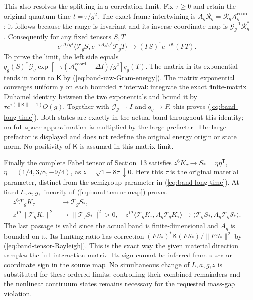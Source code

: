 This also resolves the splitting in a correlation limit. Fix
$\tau\ge0$ and retain the original quantum time $t=\tau/g^2$.
The exact frame intertwining is
$A_g\mathcal R_g=\mathcal R_g\mathcal A_g^{\mathrm{coord}}$;
it follows because the range is invariant and its inverse coordinate
map is $\mathcal G_g^{-1}\mathcal R_g^*$. Consequently for any
fixed tensors $S,T$,
\begin{equation}\label{eq:band-long-time}
 e^{\tau\Delta/g^2}
 \langle\mathcal T_gS,e^{-\tau A_g/g^2}\mathcal T_gT\rangle
 \longrightarrow (FS)^*e^{-\tau\mathsf K}(FT).
\end{equation}
To prove the limit, the left side equals
$q_g(S)^*\mathcal G_g
 \exp[-\tau(\mathcal A_g^{\mathrm{coord}}-\Delta I)/g^2]q_g(T)$.
The matrix in its exponential tends in norm to $\mathsf K$ by
(\ref{eq:band-raw-Gram-energy}). The matrix exponential converges
uniformly on each bounded $\tau$ interval: integrate the exact
finite-matrix Duhamel identity between the two exponentials and
bound it by $\tau e^{\tau(\|\mathsf K\|+1)}O(g)$.
Together with $\mathcal G_g\to I$ and $q_g\to F$, this proves
(\ref{eq:band-long-time}). Both states are exactly in the actual
band throughout this identity; no full-space approximation is
multiplied by the large prefactor. The large prefactor is displayed and
does not redefine the original energy origin or state norm. No
positivity of $\mathsf K$ is assumed in this matrix limit.

Finally the complete Fabel tensor of Section~13 satisfies
$z^6K_\tau\to S_*=\eta\eta^{\mathsf T}$,
$\eta=(1/4,3/8,-9/4)$, as $z=\sqrt{1-8\tau}\downarrow0$.
Here this $\tau$ is the original material parameter, distinct from
the semigroup parameter in (\ref{eq:band-long-time}). At fixed
$L,a,g$, linearity of (\ref{eq:band-tensor-map}) proves
\begin{align}
 z^6\mathcal T_gK_\tau&\longrightarrow\mathcal T_gS_*,\nonumber\\
 z^{12}\|\mathcal T_gK_\tau\|^2&\longrightarrow\|\mathcal T_gS_*\|^2>0,
 \quad
 z^{12}\langle\mathcal T_gK_\tau,A_g\mathcal T_gK_\tau\rangle
       \longrightarrow\langle\mathcal T_gS_*,A_g\mathcal T_gS_*\rangle.
 \label{eq:band-cusp-raw}
\end{align}
The last passage is valid since the actual band is finite-dimensional
and $A_g$ is bounded on it. Its limiting ratio has correction
$(FS_*)^*\mathsf K(FS_*)/\|FS_*\|^2$ by
(\ref{eq:band-tensor-Rayleigh}). This is the exact way the given
material direction samples the full interaction matrix. Its sign
cannot be inferred from a scalar coordinate sign in the source map.
No simultaneous change of $L,a,g,z$ is substituted for these ordered
limits: controlling their combined remainders and the nonlinear
continuum states remains necessary for the requested mass-gap violation.

